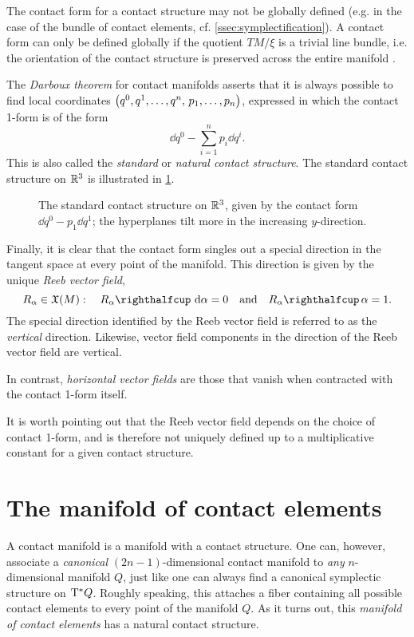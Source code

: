 The contact form for a contact structure may not be globally defined (e.g. in the case of the bundle of contact elements, cf. \cref{ssec:symplectification}). A contact form can only be defined globally if the quotient \(TM/\xi\) is a trivial line bundle, i.e. the orientation of the contact structure is preserved across the entire manifold \cite{Geiges2008}.

The \emph{Darboux theorem} for contact manifolds asserts that it is always possible to find local coordinates \(\qty(q^0, q^1, \ldots, q^n,\, p_1, \ldots, p_n)\), expressed in which the contact 1-form is of the form 
\begin{equation}
     \dd{q^0} - \sum_{i=1}^n p_i\dd{q^i}.
\end{equation}
This is also called the \emph{standard} or \emph{natural contact structure}. The standard contact structure on \(\mathbb{R}^3\) is illustrated in \cref{fig:standard_contact}.
\begin{figure}
    \centering
    
    \caption{The standard contact structure on \(\mathbb{R}^3\), given by the contact form \(\dd{q^0} - p_1\dd{q^1}\); the hyperplanes tilt more in the increasing \(y\)-direction.}
    \label{fig:standard_contact}
\end{figure}

Finally, it is clear that the contact form singles out a special direction in the tangent space at every point of the manifold. This direction is given by the unique \emph{Reeb vector field},
\begin{equation}
    R_\alpha \in \vfields{M}:\quad \intpr{R_\alpha}{\dd{\alpha}}= 0 \quad \text{and} \quad \intpr{R_\alpha}{\alpha} = 1. 
    \label{eq:reeb_vf}
\end{equation}
The special direction identified by the Reeb vector field is referred to as the \emph{vertical} direction. Likewise, vector field components in the direction of the Reeb vector field are vertical.

In contrast, \emph{horizontal vector fields} are those that vanish when contracted with the contact 1-form itself.

It is worth pointing out that the Reeb vector field depends on the choice of contact 1-form, and is therefore not uniquely defined up to a multiplicative constant for a given contact structure.

\section{The manifold of contact elements}
\label{ssec:mfd_contact_elements}
A contact manifold is a manifold with a contact structure. One can, however, associate a \emph{canonical} \((2n-1)\)-dimensional contact manifold to \emph{any} \(n\)-dimensional manifold \(Q\), just like one can always find a canonical symplectic structure on \(\mathrm{T}^*Q\). Roughly speaking, this attaches a fiber containing all possible contact elements to every point of the manifold \(Q\). As it turns out, this \emph{manifold of contact elements} has a natural contact structure.

